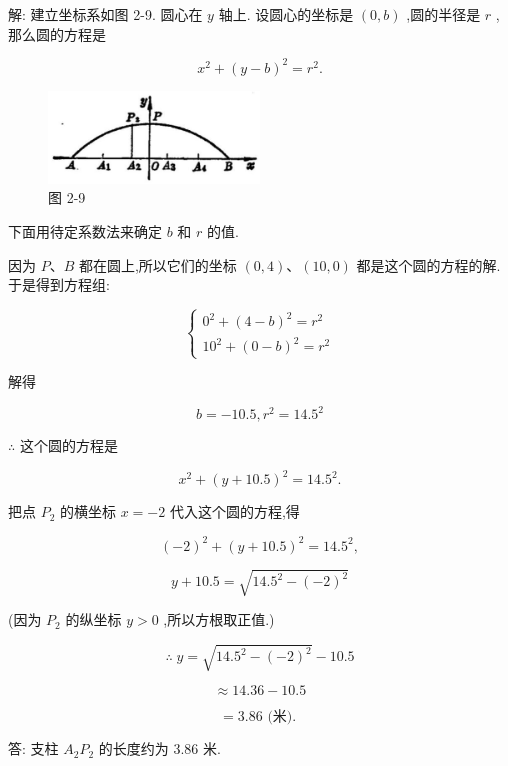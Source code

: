 \documentclass[lang=cn,newtx,10.5pt,scheme=chinese]{elegantbook}
\begin{document}
解: 建立坐标系如图 2-9. 圆心在 \(y\) 轴上. 设圆心的坐标是 \(\left( {0,b}\right)\) ,圆的半径是 \(r\) ,那么圆的方程是

\[
    {x}^{2} + {\left( y - b\right) }^{2} = {r}^{2}.
\]

\begin{figure}[h]
  \centering
  \includegraphics[max width=0.5\textwidth]{images/01912cc2-ffb6-728e-9ae7-b113ff05c64b_80_540621.jpg}
  \caption{图 2-9}
\end{figure}



下面用待定系数法来确定 \(b\) 和 \(r\) 的值.

因为 \(P\text{、}B\) 都在圆上,所以它们的坐标 \(\left( {0,4}\right) \text{、}\left( {{10},0}\right)\) 都是这个圆的方程的解. 于是得到方程组:

\[
  \left\{ \begin{array}{l} {0}^{2} + {\left( 4 - b\right) }^{2} = {r}^{2} \\ {10}^{2} + {\left( 0 - b\right) }^{2} = {r}^{2} \end{array}\right.
\]

解得

\[
  b = - {10.5},{r}^{2} = {14.5}^{2}
\]

\(\therefore\) 这个圆的方程是

\[
    {x}^{2} + {\left( y + {10.5}\right) }^{2} = {14.5}^{2}.
\]

把点 \({P}_{2}\) 的横坐标 \(x = - 2\) 代入这个圆的方程,得

\[
    {\left( -2\right) }^{2} + {\left( y + {10.5}\right) }^{2} = {14.5}^{2},
\]

\[
  y + {10.5} = \sqrt{{14.5}^{2} - {\left( -2\right) }^{2}}
\]

(因为 \({P}_{2}\) 的纵坐标 \(y > 0\) ,所以方根取正值.)

\[
  \therefore \;y = \sqrt{{14.5}^{2} - {\left( -2\right) }^{2}} - {10.5}
\]

\[
  \approx {14.36} - {10.5}
\]

\[
  = {3.86}\text{ (米). }
\]

答: 支柱 \({A}_{2}{P}_{2}\) 的长度约为 3.86 米.
\end{document}

